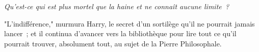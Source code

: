 \emph{Qu'est-ce qui est plus mortel que la haine et ne connaît aucune limite~?}

"L'indifférence," murmura Harry, le secret d'un sortilège qu'il ne pourrait jamais lancer~; et il continua d'avancer vers la bibliothèque pour lire tout ce qu'il pourrait trouver, absolument tout, au sujet de la Pierre Philosophale.

